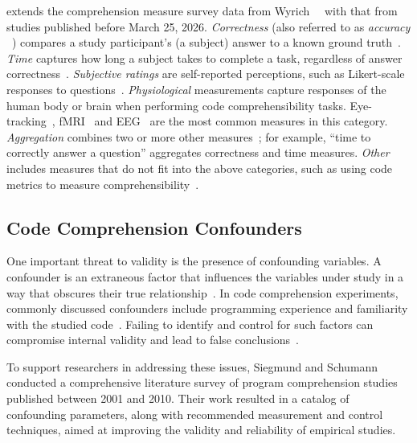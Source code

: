  extends the comprehension measure survey data from Wyrich~\etal~\cite{Wyrich:ACS23} with
that from studies published before March 25, 2026.
\emph{Correctness} (also referred to as \emph{accuracy} ~\cite{S29}) compares a study participant's (\ie a subject) answer to a known ground truth~\cite{Nielebock:ESE2019, Peitek:ICPC20, Peitek:ICSE2021, Ribeiro:ESE23, Karas:TSE2024, Park:ESE24, Alakmeh:ASE2024, Elfares:2025, Flint:2026, Abdelsalam:ESE2026}.
\emph{Time} captures how long a subject takes to complete 
a task, regardless of answer correctness~\cite{Nielebock:ESE2019, Peitek:ICPC20, Peitek:ICSE2021, Karas:TSE2024, Park:ESE24, Alakmeh:ASE2024, Elfares:2025, Abdelsalam:ESE2026}.
\emph{Subjective ratings} are self-reported perceptions, such as 
Likert-scale responses to questions~\cite{Nielebock:ESE2019, Peitek:ICSE2021, Ribeiro:ESE23, Abdelsalam:ESE2026, Alakmeh:ASE2024, Elfares:2025, Bergum:TOSEM2026}.
\emph{Physiological} measurements capture responses of the human body or brain when performing code comprehensibility tasks. 
Eye-tracking~\cite{Peitek:ICPC20, Abbad-Andaloussi:ICPC22, Park:ESE24, Abdelsalam:ESE2026}, fMRI~\cite{Peitek:ICSE2021} and EEG~\cite{Bergum:TOSEM2026} are the most common measures in this category.
\emph{Aggregation} combines two or more other measures~\cite{Ribeiro:ESE23, Alakmeh:ASE2024, Gao:EASE2025}; 
for example, ``time to correctly answer a question'' aggregates correctness 
and time measures.
\emph{Other} includes measures that do not fit into the above categories, such as using code metrics to measure comprehensibility~\cite{33-8, Nielebock:ESE2019}.

\subsection{Code Comprehension Confounders}
\label{sec:confounders}

One important threat to validity is the presence of confounding variables. A confounder is an extraneous factor that influences the variables under study in a way that obscures their true relationship~\cite{pourhoseingholi2012control}. In code comprehension experiments, commonly discussed confounders include programming experience and familiarity with the studied code~\cite{siegmund2015confounding}. Failing to identify and control for such factors can compromise internal validity and lead to false conclusions~\cite{pourhoseingholi2012control}.

To support researchers in addressing these issues, Siegmund and Schumann~\cite{siegmund2015confounding} conducted a comprehensive literature survey of program comprehension studies published between 2001 and 2010. Their work resulted in a catalog of confounding parameters, along with recommended measurement and control techniques, aimed at improving the validity and reliability of empirical studies.


